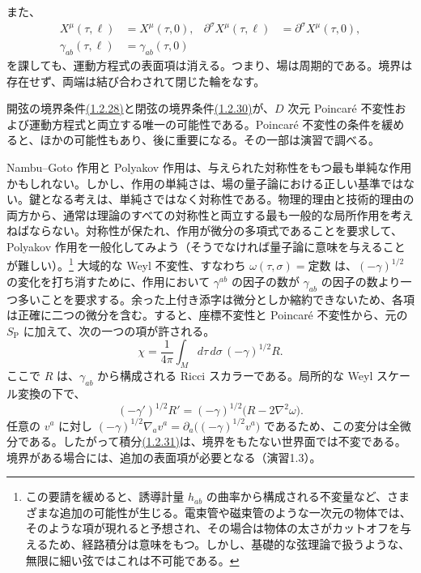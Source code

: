 また、
\begin{align}
X^\mu(\tau,\ell)&=X^\mu(\tau,0),&
\partial^\sigma X^\mu(\tau,\ell)&=\partial^\sigma X^\mu(\tau,0),
\tag{1.2.30a}\label{eq:1.2.30a}\\
\gamma_{ab}(\tau,\ell)&=\gamma_{ab}(\tau,0)
\tag{1.2.30b}\label{eq:1.2.30b}
\end{align}
を課しても、運動方程式の表面項は消える。つまり、場は周期的である。境界は存在せず、両端は結び合わされて閉じた輪をなす。

開弦の境界条件\hyperref[eq:1.2.28]{(1.2.28)}と閉弦の境界条件\hyperref[eq:1.2.30a]{(1.2.30)}が、$D$ 次元 Poincaré 不変性および運動方程式と両立する唯一の可能性である。Poincaré 不変性の条件を緩めると、ほかの可能性もあり、後に重要になる。その一部は演習で調べる。

Nambu--Goto 作用と Polyakov 作用は、与えられた対称性をもつ最も単純な作用かもしれない。しかし、作用の単純さは、場の量子論における正しい基準ではない。鍵となる考えは、単純さではなく対称性である。物理的理由と技術的理由の両方から、通常は理論のすべての対称性と両立する最も一般的な局所作用を考えねばならない。対称性が保たれ、作用が微分の多項式であることを要求して、Polyakov 作用を一般化してみよう（そうでなければ量子論に意味を与えることが難しい）。\footnote[3]{この要請を緩めると、誘導計量 $h_{ab}$ の曲率から構成される不変量など、さまざまな追加の可能性が生じる。電束管や磁束管のような一次元の物体では、そのような項が現れると予想され、その場合は物体の太さがカットオフを与えるため、経路積分は意味をもつ。しかし、基礎的な弦理論で扱うような、無限に細い弦ではこれは不可能である。}
大域的な Weyl 不変性、すなわち $\omega(\tau,\sigma)=\text{定数}$ は、$(-\gamma)^{1/2}$ の変化を打ち消すために、作用において $\gamma^{ab}$ の因子の数が $\gamma_{ab}$ の因子の数より一つ多いことを要求する。余った上付き添字は微分としか縮約できないため、各項は正確に二つの微分を含む。すると、座標不変性と Poincaré 不変性から、元の $S_{\mathrm P}$ に加えて、次の一つの項が許される。
\begin{equation}
\chi=\frac{1}{4\pi}\int_M d\tau\,d\sigma\,(-\gamma)^{1/2}R.
\tag{1.2.31}\label{eq:1.2.31}
\end{equation}
ここで $R$ は、$\gamma_{ab}$ から構成される Ricci スカラーである。局所的な Weyl スケール変換の下で、
\begin{equation}
(-\gamma')^{1/2}R'=(-\gamma)^{1/2}\bigl(R-2\nabla^2\omega\bigr).
\tag{1.2.32}\label{eq:1.2.32}
\end{equation}
任意の $v^a$ に対し $(-\gamma)^{1/2}\nabla_av^a
=\partial_a\bigl((-\gamma)^{1/2}v^a\bigr)$ であるため、この変分は全微分である。したがって積分\hyperref[eq:1.2.31]{(1.2.31)}は、境界をもたない世界面では不変である。境界がある場合には、追加の表面項が必要となる（演習1.3）。

